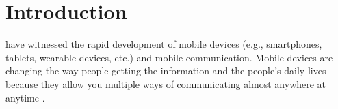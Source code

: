 \documentclass[journal]{IEEEtran}
\begin{document}

\IEEEpeerreviewmaketitle

\section{Introduction}

 have witnessed the rapid development of mobile devices (e.g., smartphones, tablets, wearable devices, etc.) and mobile communication. Mobile devices are changing the way people getting the information and the people’s daily lives because they allow you multiple ways of communicating almost anywhere at anytime \cite{satyanarayanan2010mobile}.
\end{document}
